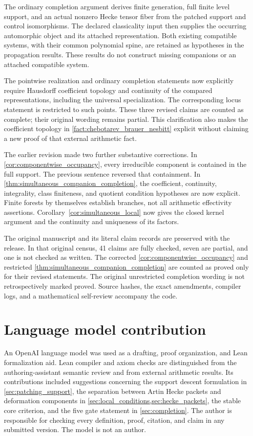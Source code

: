 \documentclass[11pt]{amsart}
\theoremstyle{definition}
\theoremstyle{remark}
\begin{document}
The ordinary completion argument derives finite generation, full finite level support, and an actual nonzero Hecke tensor fiber from the patched support and control isomorphisms. The declared classicality input then supplies the occurring automorphic object and its attached representation. Both existing compatible systems, with their common polynomial spine, are retained as hypotheses in the propagation results. These results do not construct missing companions or an attached compatible system.

The pointwise realization and ordinary completion statements now explicitly require Hausdorff coefficient topology and continuity of the compared representations, including the universal specialization. The corresponding locus statement is restricted to such points. These three revised claims are counted as complete; their original wording remains partial. This clarification also makes the coefficient topology in \cref{fact:chebotarev_brauer_nesbitt} explicit without claiming a new proof of that external arithmetic fact.

The earlier revision made two further substantive corrections. In \cref{cor:componentwise_occupancy}, every irreducible component is contained in the full support. The previous sentence reversed that containment. In \cref{thm:simultaneous_companion_completion}, the coefficient, continuity, integrality, class finiteness, and quotient condition hypotheses are now explicit. Finite forests by themselves establish branches, not all arithmetic effectivity assertions. Corollary~\ref{cor:simultaneous_local} now gives the closed kernel argument and the continuity and uniqueness of its factors.

The original manuscript and its literal claim records are preserved with the release. In that original census, 41 claims are fully checked, seven are partial, and one is not checked as written. The corrected \cref{cor:componentwise_occupancy} and restricted \cref{thm:simultaneous_companion_completion} are counted as proved only for their revised statements. The original unrestricted completion wording is not retrospectively marked proved. Source hashes, the exact amendments, compiler logs, and a mathematical self-review accompany the code.

\section*{Language model contribution}

An OpenAI language model was used as a drafting, proof organization, and Lean formalization aid. Lean compiler and axiom checks are distinguished from the authoring-assistant semantic review and from external arithmetic results. Its contributions included suggestions concerning the support descent formulation in \cref{sec:patching_support}, the separation between Artin Hecke packets and deformation components in \cref{sec:local_conditions,sec:hecke_packets}, the stable core criterion, and the five gate statement in \cref{sec:completion}. The author is responsible for checking every definition, proof, citation, and claim in any submitted version. The model is not an author.



\end{document}
